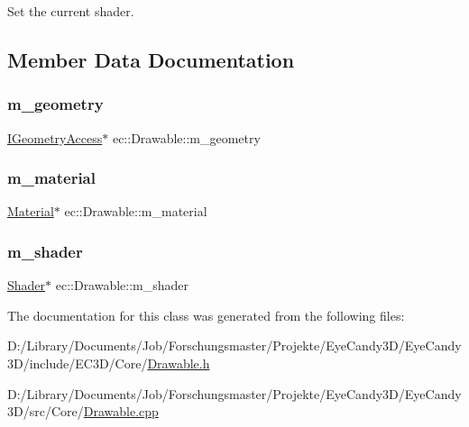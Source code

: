 Set the current shader. 

\subsection{Member Data Documentation}
\mbox{\label{classec_1_1_drawable_a12fc649448250ab8a16e862495d22752}} 
\subsubsection{\texorpdfstring{m\+\_\+geometry}{m\_geometry}}
{\footnotesize\ttfamily \mbox{\hyperlink{classec_1_1_i_geometry_access}{I\+Geometry\+Access}}$\ast$ ec\+::\+Drawable\+::m\+\_\+geometry\hspace{0.3cm}{\ttfamily [protected]}}

\mbox{\label{classec_1_1_drawable_ae95da71e937a2008a84300b8d29ac052}} 
\subsubsection{\texorpdfstring{m\+\_\+material}{m\_material}}
{\footnotesize\ttfamily \mbox{\hyperlink{classec_1_1_material}{Material}}$\ast$ ec\+::\+Drawable\+::m\+\_\+material\hspace{0.3cm}{\ttfamily [protected]}}

\mbox{\label{classec_1_1_drawable_aee71f07b65189391a7a465d880d744e3}} 
\subsubsection{\texorpdfstring{m\+\_\+shader}{m\_shader}}
{\footnotesize\ttfamily \mbox{\hyperlink{classec_1_1_shader}{Shader}}$\ast$ ec\+::\+Drawable\+::m\+\_\+shader\hspace{0.3cm}{\ttfamily [protected]}}



The documentation for this class was generated from the following files\+:\begin{DoxyCompactItemize}
\item 
D\+:/\+Library/\+Documents/\+Job/\+Forschungsmaster/\+Projekte/\+Eye\+Candy3\+D/\+Eye\+Candy3\+D/include/\+E\+C3\+D/\+Core/\mbox{\hyperlink{_drawable_8h}{Drawable.\+h}}\item 
D\+:/\+Library/\+Documents/\+Job/\+Forschungsmaster/\+Projekte/\+Eye\+Candy3\+D/\+Eye\+Candy3\+D/src/\+Core/\mbox{\hyperlink{_drawable_8cpp}{Drawable.\+cpp}}\end{DoxyCompactItemize}
